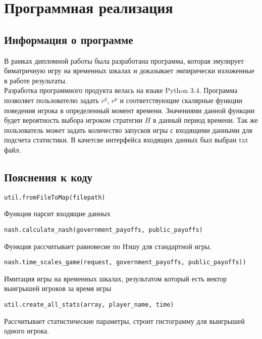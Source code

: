 \section{Программная реализация} 

\subsection{Информация о программе}
В рамках дипломной работы была разработана программа, которая эмулирует биматричную игру на временных шкалах и доказывает эмпирически изложенные в работе результаты. 
\\

Разработка программного продукта велась на языке Python 3.4.
Программа позволяет пользователю задать $r^g$, $r^p$ и соответствующие скалярные функции поведения игрока в определенный момент времени. Значениями данной функции будет вероятность выбора игроком  стратегии $H$ в данный период времени. Так же пользователь может задать количество запусков игры с входящими данными для подсчета статистики. В качетсве интерфейса входящих данных был выбран txt файл.

\subsection{Пояснения к коду}
 \begin{lstlisting}[style=csharpinlinestyle]
	 util.fromFileToMap(filepath) 
 \end{lstlisting}
Функция парсит входящие данных

 \begin{lstlisting}[style=csharpinlinestyle]
	 nash.calculate_nash(government_payoffs, public_payoffs)
 \end{lstlisting}
 Функция рассчитывает равновесие по Нэшу для стандартной игры.
 
 
 \begin{lstlisting}[style=csharpinlinestyle]
	 nash.time_scales_game(request, government_payoffs, public_payoffs))
 \end{lstlisting}
 Имитация игры на временных шкалах, результатом который есть вектор выигрышей игроков за время игры
 
  \begin{lstlisting}[style=csharpinlinestyle]
	  util.create_all_stats(array, player_name, time)
  \end{lstlisting}
 Рассчитывает статистические параметры, строит гистограмму для выигрышей одного игрока.
 
